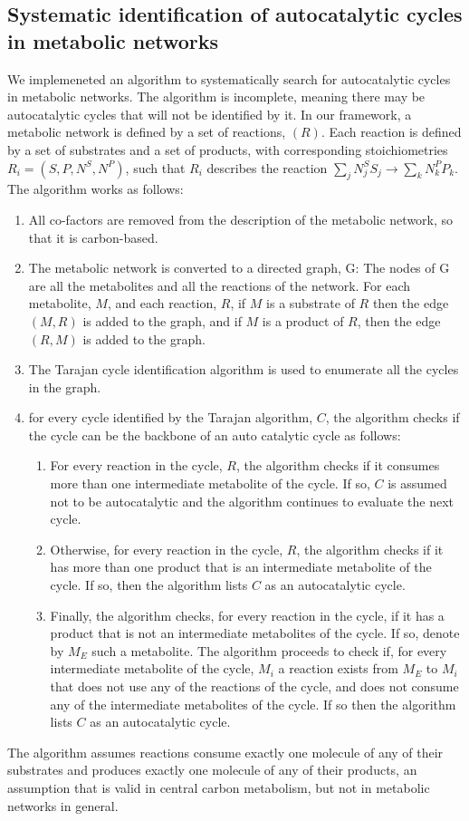   \subsection{Systematic identification of autocatalytic cycles in metabolic networks}
  We implemeneted an algorithm to systematically search for autocatalytic cycles in metabolic networks.
  The algorithm is incomplete, meaning there may be autocatalytic cycles that will not be identified by it.
  In our framework, a metabolic network is defined by a set of reactions, $(R)$.
  Each reaction is defined by a set of substrates and a set of products, with corresponding stoichiometries $R_i=(S,P,N^S,N^P)$, such that $R_i$ describes the reaction $\sum_j N_j^SS_j \rightarrow \sum_k N_k^PP_k$.
  The algorithm works as follows:
  \begin{enumerate}
    \item All co-factors are removed from the description of the metabolic network, so that it is carbon-based.
    \item The metabolic network is converted to a directed graph, G:
  The nodes of G are all the metabolites and all the reactions of the network.
  For each metabolite, $M$, and each reaction, $R$, if $M$ is a substrate of $R$ then the edge $(M,R)$ is added to the graph, and if $M$ is a product of $R$, then the edge $(R,M)$ is added to the graph.
    \item The Tarajan cycle identification algorithm is used to enumerate all the cycles in the graph.
    \item for every cycle identified by the Tarajan algorithm, $C$, the algorithm checks if the cycle can be the backbone of an auto catalytic cycle as follows:
        \begin{enumerate}
            \item For every reaction in the cycle, $R$, the algorithm checks if it consumes more than one  intermediate metabolite of the cycle.
              If so, $C$ is assumed not to be autocatalytic and the algorithm continues to evaluate the next cycle.
            \item Otherwise, for every reaction in the cycle, $R$, the algorithm checks if it has more than one product that is an intermediate metabolite of the cycle.
              If so, then the algorithm lists $C$ as an autocatalytic cycle.
            \item Finally, the algorithm checks, for every reaction in the cycle, if it has a product that is not an intermediate metabolites of the cycle.
                If so, denote by $M_E$ such a metabolite.
            The algorithm proceeds to check if, for every intermediate metabolite of the cycle, $M_i$ a reaction exists from $M_E$ to $M_i$ that does not use any of the reactions of the cycle, and does not consume any of the intermediate metabolites of the cycle.
            If so then the algorithm lists $C$ as an autocatalytic cycle.
        \end{enumerate}
  \end{enumerate}

  The algorithm assumes reactions consume exactly one molecule of any of their substrates and produces exactly one molecule of any of their products, an assumption that is valid in central carbon metabolism, but not in metabolic networks in general.
  
